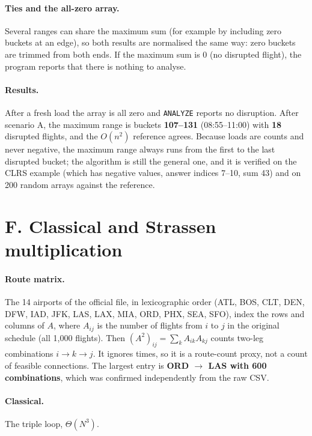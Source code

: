 \documentclass[11pt]{article}
\begin{document}
\paragraph{Ties and the all-zero array.}
Several ranges can share the maximum sum (for example by including zero
buckets at an edge), so both results are normalised the same way: zero buckets
are trimmed from both ends. If the maximum sum is $0$ (no disrupted flight),
the program reports that there is nothing to analyse.

\paragraph{Results.}
After a fresh load the array is all zero and \texttt{ANALYZE} reports no
disruption. After scenario A, the maximum range is buckets
\textbf{107--131} (08:55--11:00) with \textbf{18} disrupted flights, and the
$O(n^2)$ reference agrees. Because loads are counts and never negative, the
maximum range always runs from the first to the last disrupted bucket; the
algorithm is still the general one, and it is verified on the CLRS example
(which has negative values, answer indices 7--10, sum 43) and on 200 random
arrays against the reference.

\section{F. Classical and Strassen multiplication}

\paragraph{Route matrix.}
The 14 airports of the official file, in lexicographic order
(ATL, BOS, CLT, DEN, DFW, IAD, JFK, LAS, LAX, MIA, ORD, PHX, SEA, SFO), index
the rows and columns of $A$, where $A_{ij}$ is the number of flights from $i$
to $j$ in the original schedule (all 1{,}000 flights). Then
$(A^2)_{ij} = \sum_k A_{ik}A_{kj}$ counts two-leg combinations $i \to k \to j$.
It ignores times, so it is a route-count proxy, not a count of feasible
connections. The largest entry is \textbf{ORD $\to$ LAS with 600
combinations}, which was confirmed independently from the raw CSV.

\paragraph{Classical.} The triple loop, $\Theta(N^3)$.
\end{document}
